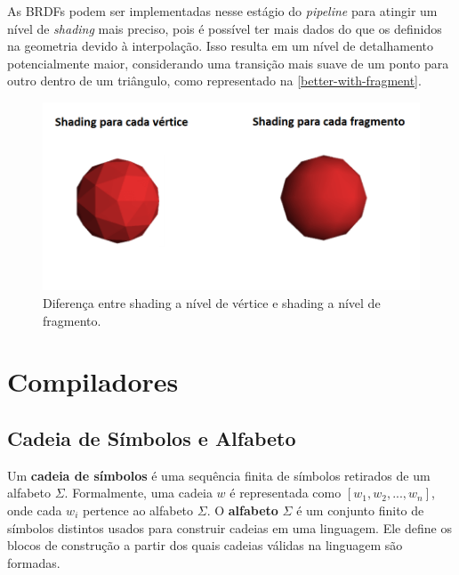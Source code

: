 \documentclass[english,
               brazil,
               bsc] %
               {dcomp-abntex2}
\begin{document}
As BRDFs podem ser implementadas nesse estágio do \textit{pipeline} para atingir um nível de \textit{shading} mais preciso, pois é possível ter mais dados do que os definidos na geometria devido à interpolação. Isso resulta em um nível de detalhamento potencialmente maior, considerando uma transição mais suave de um ponto para outro dentro de um triângulo,  como representado na \autoref{better-with-fragment}.




\begin{figure}[H]
        \caption{\label{better-with-fragment} \small Diferença entre shading a nível de vértice e shading a nível de fragmento.}
        \begin{center}
            \includegraphics[scale=0.5]{./Imagens/per_vertex_per_frag.png}
        \end{center}
\end{figure}


\section{Compiladores} \label{compiladores}


\subsection{Cadeia de Símbolos e Alfabeto} \label{símbolos}


Um \textbf{cadeia de símbolos} é uma sequência finita de símbolos retirados de um alfabeto $ \Sigma $. Formalmente, uma cadeia $ w $ é representada como $ [w_1, w_2, ..., w_n] $, onde cada $ w_i $ pertence ao alfabeto $ \Sigma $. O \textbf{alfabeto} $ \Sigma $ é um conjunto finito de símbolos distintos usados para construir cadeias em uma linguagem. Ele define os blocos de construção a partir dos quais cadeias válidas na linguagem são formadas.
\end{document}
